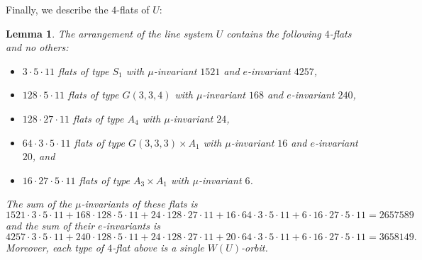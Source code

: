 \documentclass[11pt, reqno]{amsart}
\numberwithin{equation}{section}
\theoremstyle{definition}
\theoremstyle{plain}
\newtheorem{lemma}[theorem]{Lemma}
\begin{document}
Finally, we describe the $4$-flats of $U$:

\begin{lemma}
The arrangement of the line system $U$ contains the following $4$-flats and no others:
\begin{itemize}
\item[(a)] $3 \cdot 5 \cdot 11$ flats of type $S_1$ with $\mu$-invariant $1521$ and $e$-invariant $4257$,
\item[(b)] $128 \cdot 5 \cdot 11$ flats of type $G(3,3,4)$ with $\mu$-invariant $168$ and $e$-invariant $240$,
\item[(c)] $128 \cdot 27 \cdot 11$ flats of type $A_4$ with $\mu$-invariant $24$,
\item[(d)] $64 \cdot 3 \cdot 5 \cdot 11$ flats of type $G(3,3,3) \times A_1$ with $\mu$-invariant $16$ and $e$-invariant $20$, and
\item[(e)] $16 \cdot 27 \cdot 5 \cdot 11$ flats of type $A_3 \times A_1$ with $\mu$-invariant $6$.
\end{itemize} The sum of the $\mu$-invariants of these flats is
$$1521 \cdot 3 \cdot 5 \cdot 11+168 \cdot 128 \cdot 5 \cdot 11+24\cdot 128 \cdot 27 \cdot 11+16 \cdot 64 \cdot 3 \cdot 5 \cdot 11+6 \cdot 16 \cdot 27 \cdot 5 \cdot 11=2657589$$ and the sum of their $e$-invariants is
$$4257 \cdot 3 \cdot 5 \cdot 11+240 \cdot 128 \cdot 5 \cdot 11+24\cdot 128 \cdot 27 \cdot 11+20 \cdot 64 \cdot 3 \cdot 5 \cdot 11+6 \cdot 16 \cdot 27 \cdot 5 \cdot 11=3658149.$$ Moreover, each type of $4$-flat above is a single $W(U)$-orbit.
\end{lemma}
\end{document}
